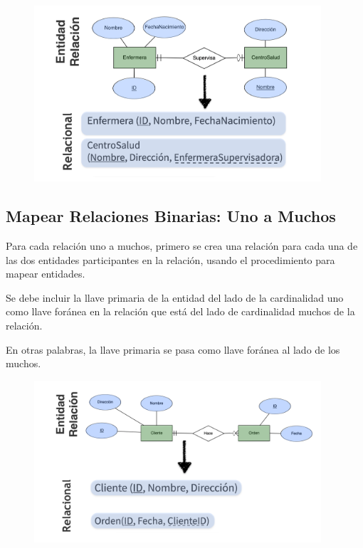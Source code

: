 \documentclass[12pt, fleqn]{report}                             %
\begin{document}
                \begin{figure}[h]
                    \centering
                    \includegraphics[width=0.95\textwidth]{MapeoRelacionesBinariasUnoUno}
                \end{figure}

                


            \clearpage
            \subsection{Mapear Relaciones Binarias: Uno a Muchos}

                Para cada relación uno a muchos, primero se crea una relación para cada una de las dos
                entidades participantes en la relación, usando el procedimiento para mapear entidades.

                Se debe incluir la llave primaria de la entidad del lado de la cardinalidad uno como llave
                foránea en la relación que está del lado de cardinalidad muchos de la relación.

                En otras palabras, la llave primaria se pasa como llave foránea al lado de los muchos.

                \begin{figure}[h]
                    \centering
                    \includegraphics[width=0.95\textwidth]{MapeoRelacionesBinariasUnoMuchos}
                \end{figure}
\end{document}

